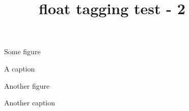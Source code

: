 \documentclass{article}
\title{float tagging test - 2}
\begin{document}
\begin{figure}[H]
Some figure
\caption{A caption}
\end{figure}

\begin{figure}
Another figure
\caption{Another caption}
\end{figure}
\end{document}
